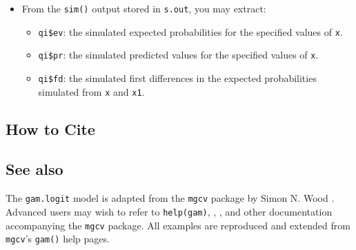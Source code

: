 \begin{itemize}
\item From the {\tt sim()} output stored in {\tt s.out}, you may extract:
\begin{itemize}
\item {\tt qi\$ev}: the simulated expected probabilities for the specified values of {\tt x}.
\item {\tt qi\$pr}: the simulated predicted values for the specified values of {\tt x}.
\item {\tt qi\$fd}: the simulated first differences in the expected probabilities simulated from {\tt x} and {\tt x1}.
\end{itemize}
\end{itemize}

\subsection* {How to Cite} 



\subsection* {See also}
The {\tt gam.logit} model is adapted from the  {\tt mgcv} package by Simon N. Wood \citep{Wood06}. Advanced users may wish to refer to {\tt help(gam)},  \cite{Wood04}, \cite{Wood00}, and other documentation accompanying the {\tt mgcv} package. All examples are reproduced and extended from {\tt mgcv}'s {\tt gam()} help pages.
